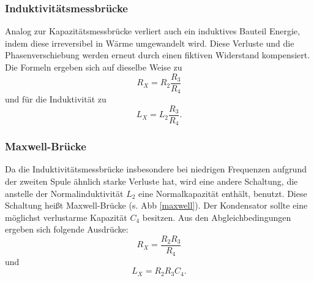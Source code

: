 \subsubsection{Induktivitätsmessbrücke}
Analog zur Kapazitätsmessbrücke verliert auch ein induktives Bauteil Energie, indem diese irreversibel in Wärme umgewandelt wird. 
Diese Verluste und die Phasenverschiebung werden erneut durch einen fiktiven Widerstand kompensiert. 
Die Formeln ergeben sich auf dieselbe Weise zu 
\begin{equation}
    R_X = R_2 \frac{R_3}{R_4}
    \label{eqn:c_r}
\end{equation}
und für die Induktivität zu 
\begin{equation}
    L_X = L_2 \frac{R_3}{R_4}.
    \label{eqn:c_l}
\end{equation}

\subsubsection{Maxwell-Brücke}
Da die Induktivitätsmessbrücke insbesondere bei niedrigen Frequenzen aufgrund der zweiten Spule ähnlich starke Verluste hat, 
wird eine andere Schaltung, die anstelle der Normalinduktivität $L_2$ eine Normalkapazität enthält, benutzt.
Diese Schaltung heißt Maxwell-Brücke (s. Abb \ref{maxwell}).
Der Kondensator sollte eine möglichst verlustarme Kapazität $C_4$ besitzen. 
Aus den Abgleichbedingungen ergeben sich folgende Ausdrücke:
\begin{equation}
     R_X = \frac{R_2R_3}{R_4}
     \label{eqn:d_r}
\end{equation}
und 
\begin{equation}
    L_X = R_2R_3C_4.
    \label{eqn:d_l}
\end{equation}


